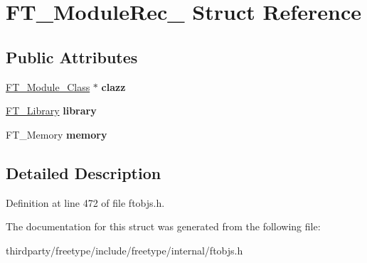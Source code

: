 \hypertarget{struct_f_t___module_rec__}{}\section{F\+T\+\_\+\+Module\+Rec\+\_\+ Struct Reference}
\label{struct_f_t___module_rec__}
\subsection*{Public Attributes}
\begin{DoxyCompactItemize}
\item 
\mbox{\label{struct_f_t___module_rec___ac762573dc13af2d2af190a9e855742f5}} 
\hyperlink{struct_f_t___module___class__}{F\+T\+\_\+\+Module\+\_\+\+Class} $\ast$ {\bfseries clazz}
\item 
\mbox{\label{struct_f_t___module_rec___ac3d04fbdc2988bf9a39f4ad6d3cb4b5f}} 
\hyperlink{struct_f_t___library_rec__}{F\+T\+\_\+\+Library} {\bfseries library}
\item 
\mbox{\label{struct_f_t___module_rec___a33113e9eb2d6cd8ee6666da75ff8e108}} 
F\+T\+\_\+\+Memory {\bfseries memory}
\end{DoxyCompactItemize}


\subsection{Detailed Description}


Definition at line 472 of file ftobjs.\+h.



The documentation for this struct was generated from the following file\+:\begin{DoxyCompactItemize}
\item 
thirdparty/freetype/include/freetype/internal/ftobjs.\+h\end{DoxyCompactItemize}
